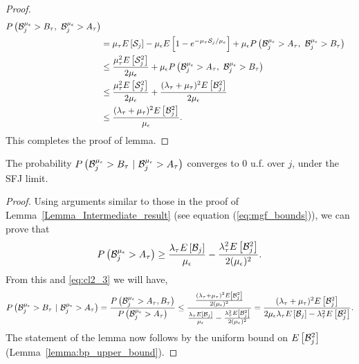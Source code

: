 \begin{proof}
\begin{align*}
	\prob{ \B^{\mue}_j > B_\t,\ \B^{\mue}_j > A_\t} \\
	&= \mu_\t \Exp{\S_j} - \mue   E\left [1-  e^{-\mu_\t \S_j  / \mue }  \right ]   + \mue
	\prob{\B^{\mue}_j > A_\t,\ \B^{\mue}_j > B_\t} \\
	&\leq \frac{\mu_\t^2 \Exp{\S^2_j}}{2 \mue} + \mue \prob{\B^{\mue}_j >
		A_\t,\ \B^{\mue}_j > B_\t} \\
	&\le \frac{\mu_\t^2 \Exp{\S^2_j}}{2 \mue} + \frac{(\lambda_\t+ \mu_\t)^2\Exp{\B^2_j}}{2 \mue} \\
	&\leq \frac{(\lambda_\t+ \mu_\t)^2\Exp{\B^2_j}}{\mue}.
	\end{align*}
	This completes the proof of lemma.
\end{proof}
%
%
\begin{lemma}
	\label{Lemma_Intermediate_result_1}
The probability $\prob{\B^{\mue}_j > B_\t\ |\ \B^{\mue}_j > A_\t}$
converges to 0 u.f. over $j$, under the SFJ limit.	
\end{lemma}

\begin{proof}  %
Using arguments similar to those in the proof of Lemma~\ref{Lemma_Intermediate_result} (see  equation (\ref{eq:mgf_bounds})), we can prove that $$\prob{\B^{\mue}_j > A_\t} \geq \frac{\lambda_\t \Exp{\B_j}}{\mue} -
\frac{\lambda_\t^2 \Exp{\B^2_j}}{2 (\mue)^2}.$$ From this and \eqref{eq:cl2_3} we will have,
	\begin{align*}
	\prob{\B^{\mue}_j > B_\t\ |\ \B^{\mue}_j > A_\t} =
	\frac{\prob{\B^{\mue}_j > A_\t,B_\t}}{\prob{\B^{\mue}_j > A_\t}} 
	\displaystyle \leq \frac{\frac{(\lambda_\t + \mu_\t)^2
			\Exp{\B^2_j}}{ 2 (\mue)^2}}{\frac{\lambda_\t \Exp{\B_j}}{\mue} -
		\frac{\lambda_\t^2 \Exp{\B^2_j}}{2 (\mue)^2}} 
	\displaystyle = \frac{(\lambda_\t + \mu_\t)^2
		\Exp{\B^2_j}}{2 \mue \lambda_\t \Exp{\B_j} -
		\lambda_\t^2 \Exp{\B^2_j}}.
	\end{align*} The statement of the lemma now follows by the uniform bound on $\Exp{\B^2_j}$ (Lemma~\ref{lemma:bp_upper_bound}).
\end{proof}

